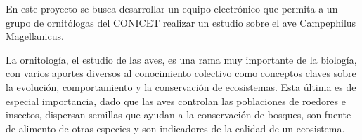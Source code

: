 En este proyecto se busca desarrollar un equipo electrónico que permita a un grupo de ornitólogas del CONICET realizar un estudio sobre el ave Campephilus Magellanicus.

La ornitología, el estudio de las aves, es una rama muy importante de la biología, con varios aportes diversos al conocimiento colectivo como conceptos claves sobre la evolución, comportamiento y la conservación de ecosistemas. Esta última es de especial importancia, dado que las aves controlan las poblaciones de roedores e insectos, dispersan semillas que ayudan a la conservación de bosques, son fuente de alimento de otras especies y son indicadores de la calidad de un ecosistema.